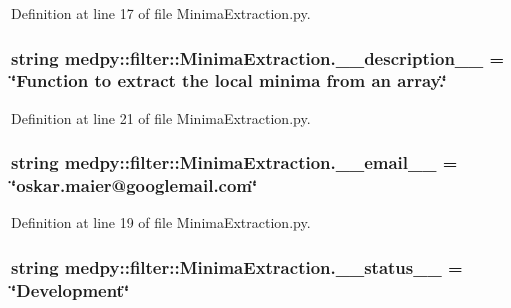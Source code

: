 Definition at line 17 of file MinimaExtraction.py.

\hypertarget{namespacemedpy_1_1filter_1_1MinimaExtraction_a16b929ea09f091b1565a67d9e64bd8f9}{
\subsubsection[{\_\-\_\-description\_\-\_\-}]{\setlength{\rightskip}{0pt plus 5cm}string {\bf medpy::filter::MinimaExtraction.\_\-\_\-description\_\-\_\-} = \char`\"{}Function to extract the local minima from an array.\char`\"{}}}
\label{namespacemedpy_1_1filter_1_1MinimaExtraction_a16b929ea09f091b1565a67d9e64bd8f9}


Definition at line 21 of file MinimaExtraction.py.

\hypertarget{namespacemedpy_1_1filter_1_1MinimaExtraction_a9aa117983f466c56dca7af1f00a5c4b7}{
\subsubsection[{\_\-\_\-email\_\-\_\-}]{\setlength{\rightskip}{0pt plus 5cm}string {\bf medpy::filter::MinimaExtraction.\_\-\_\-email\_\-\_\-} = \char`\"{}oskar.maier@googlemail.com\char`\"{}}}
\label{namespacemedpy_1_1filter_1_1MinimaExtraction_a9aa117983f466c56dca7af1f00a5c4b7}


Definition at line 19 of file MinimaExtraction.py.

\hypertarget{namespacemedpy_1_1filter_1_1MinimaExtraction_a329b20ff88f6a7d47851b8798e61a553}{
\subsubsection[{\_\-\_\-status\_\-\_\-}]{\setlength{\rightskip}{0pt plus 5cm}string {\bf medpy::filter::MinimaExtraction.\_\-\_\-status\_\-\_\-} = \char`\"{}Development\char`\"{}}}
\label{namespacemedpy_1_1filter_1_1MinimaExtraction_a329b20ff88f6a7d47851b8798e61a553}


